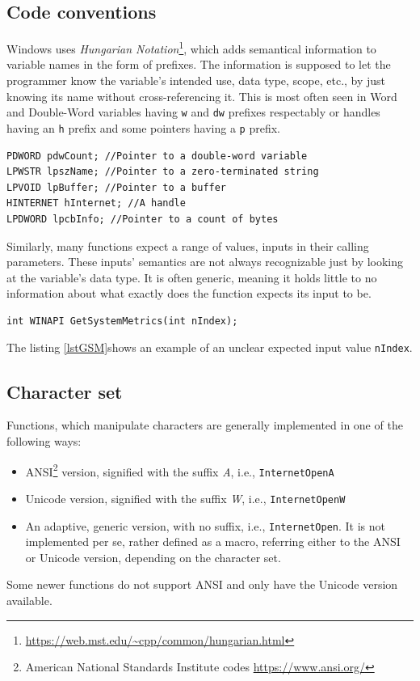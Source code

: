 \subsection*{Code conventions}
Windows uses \textit{Hungarian Notation}\footnote{\url{https://web.mst.edu/~cpp/common/hungarian.html}}, which adds semantical information to variable names in the form of prefixes. The information is supposed to let the programmer know the variable's intended use, data type, scope, etc., by just knowing its name without cross-referencing it. This is most often seen in Word and Double-Word variables having \lstinline{w} and \lstinline{dw} prefixes respectably or handles having an \lstinline{h} prefix and some pointers having a \lstinline{p} prefix.\cite{WinConventions}

\begin{lstlisting}[caption={An example of hungarian notation}]
PDWORD pdwCount; //Pointer to a double-word variable
LPWSTR lpszName; //Pointer to a zero-terminated string
LPVOID lpBuffer; //Pointer to a buffer
HINTERNET hInternet; //A handle
LPDWORD lpcbInfo; //Pointer to a count of bytes
\end{lstlisting}

Similarly, many functions expect a range of values, inputs in their calling parameters. These inputs' semantics are not always recognizable just by looking at the variable's data type. It is often generic, meaning it holds little to no information about what exactly does the function expects its input to be.
\begin{lstlisting}[caption={GetSystemMetrics prototype},label=lstGSM]
int WINAPI GetSystemMetrics(int nIndex);
\end{lstlisting}
The listing \ref{lstGSM}shows an example of an unclear expected input value \lstinline{nIndex}.\cite{WinGetSM}

\subsection*{Character set}
Functions, which manipulate characters are generally implemented in one of the following ways:
\begin{itemize}
    \item ANSI\footnote{American National Standards Institute codes \url{https://www.ansi.org/}} version, signified with the suffix \textit{A}, i.e., \lstinline{InternetOpenA}
    \item Unicode version, signified with the suffix \textit{W}, i.e., \lstinline{InternetOpenW}
    \item An adaptive, generic version, with no suffix, i.e., \lstinline{InternetOpen}. It is not implemented per se, rather defined as a macro, referring either to the ANSI or Unicode version, depending on the character set.
\end{itemize}
Some newer functions do not support ANSI and only have the Unicode version available.\cite{WinUnicode}


